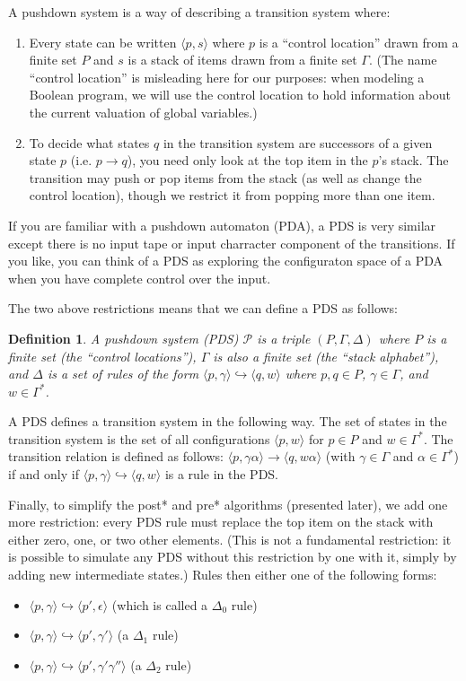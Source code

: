 \documentclass{article}
\newcommand{\Config}[2]{\ensuremath{\langle #1, #2 \rangle}}
\newcommand{\Rule}[2]{\ensuremath{#1 \hookrightarrow #2}}
\newtheorem{definition}{Definition}
\begin{document}
A pushdown system is a way of describing a transition system where:
\begin{enumerate}
\item Every state can be written \Config{p}{s} where $p$ is a
  ``control location'' drawn from a finite set $P$ and $s$ is a stack
  of items drawn from a finite set $\Gamma$. (The name ``control
  location'' is misleading here for our purposes: when modeling a
  Boolean program, we will use the control location to hold
  information about the current valuation of global variables.)
\item To decide what states $q$ in the transition system are
  successors of a given state $p$ (i.e. $p \rightarrow q$), you need
  only look at the top item in the $p$'s stack. The transition may
  push or pop items from the stack (as well as change the control
  location), though we restrict it from popping more than one item.
\end{enumerate}

If you are familiar with a pushdown automaton (PDA), a PDS is very
similar except there is no input tape or input charracter component of
the transitions. If you like, you can think of a PDS as exploring the
configuraton space of a PDA when you have complete control over the
input.

The two above restrictions means that we can define a PDS as follows:

\begin{definition} A pushdown system (PDS) $\mathcal{P}$ is a triple $(P, \Gamma,
  \Delta)$ where $P$ is a finite set (the ``control locations''),
  $\Gamma$ is also a finite set (the ``stack alphabet''), and $\Delta$
  is a set of rules of the form
  \Rule{\Config{p}{\gamma}}{\Config{q}{w}} where $p, q \in P$, $\gamma
  \in \Gamma$, and $w \in \Gamma^*$.
\end{definition}

A PDS defines a transition system in the following way. The set of
states in the transition system is the set of all configurations
\Config{p}{w} for $p \in P$ and $w \in \Gamma^*$. The transition
relation is defined as follows: $\Config{p}{\gamma\alpha} \rightarrow
\Config{q}{w\alpha}$ (with $\gamma \in \Gamma$ and $\alpha \in
\Gamma^*$) if and only if $\Rule{\Config{p}{\gamma}}{\Config{q}{w}}$
is a rule in the PDS.

Finally, to simplify the post* and pre* algorithms (presented later),
we add one more restriction: every PDS rule must replace the top item
on the stack with either zero, one, or two other elements. (This is
not a fundamental restriction: it is possible to simulate any PDS
without this restriction by one with it, simply by adding new
intermediate states.) Rules then either one of the following forms:
\begin{itemize}
\item \Rule{\Config{p}{\gamma}}{\Config{p'}{\epsilon}} (which is called a
$\Delta_0$ rule)
\item \Rule{\Config{p}{\gamma}}{\Config{p'}{\gamma'}} (a $\Delta_1$
  rule)
\item \Rule{\Config{p}{\gamma}}{\Config{p'}{\gamma'\gamma''}} (a
  $\Delta_2$ rule)
\end{itemize}
\end{document}
